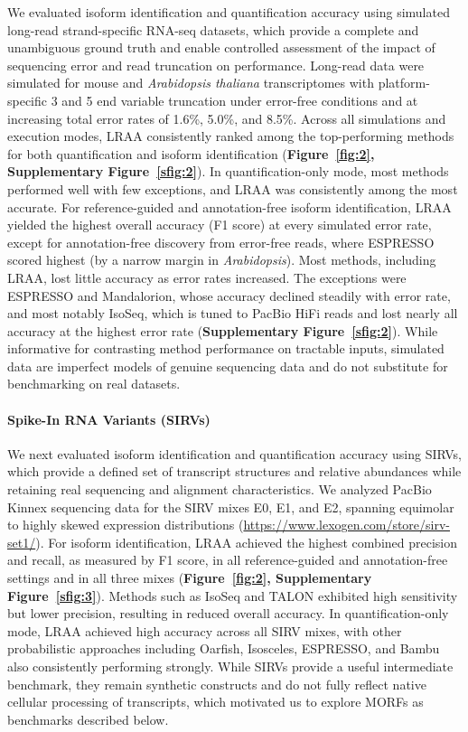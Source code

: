 We evaluated isoform identification and quantification accuracy using simulated long-read strand-specific RNA-seq datasets, which provide a complete and unambiguous ground truth and enable controlled assessment of the impact of sequencing error and read truncation on performance. Long-read data were simulated for mouse and \emph{Arabidopsis thaliana} transcriptomes with platform-specific 3\p{} and 5\p{} end variable truncation under error-free conditions and at increasing total error rates of 1.6\%, 5.0\%, and 8.5\%. Across all simulations and execution modes, LRAA consistently ranked among the top-performing methods for both quantification and isoform identification (\textbf{Figure~\ref{fig:2}, Supplementary Figure~\ref{sfig:2}}). In quantification-only mode, most methods performed well with few exceptions, and LRAA was consistently among the most accurate. For reference-guided and annotation-free isoform identification, LRAA yielded the highest overall accuracy (F1 score) at every simulated error rate, except for annotation-free discovery from error-free reads, where ESPRESSO scored highest (by a narrow margin in \emph{Arabidopsis}). Most methods, including LRAA, lost little accuracy as error rates increased. The exceptions were ESPRESSO and Mandalorion, whose accuracy declined steadily with error rate, and most notably IsoSeq, which is tuned to PacBio HiFi reads and lost nearly all accuracy at the highest error rate (\textbf{Supplementary Figure~\ref{sfig:2}}). While informative for contrasting method performance on tractable inputs, simulated data are imperfect models of genuine sequencing data and do not substitute for benchmarking on real datasets.

\paragraph{Spike-In RNA Variants (SIRVs)}\label{spike-in-rna-variants-sirvs}

We next evaluated isoform identification and quantification accuracy using SIRVs, which provide a defined set of transcript structures and relative abundances while retaining real sequencing and alignment characteristics. We analyzed PacBio Kinnex sequencing data for the SIRV mixes E0, E1, and E2, spanning equimolar to highly skewed expression distributions (\url{https://www.lexogen.com/store/sirv-set1/}). For isoform identification, LRAA achieved the highest combined precision and recall, as measured by F1 score, in all reference-guided and annotation-free settings and in all three mixes (\textbf{Figure~\ref{fig:2}, Supplementary Figure~\ref{sfig:3}}). Methods such as IsoSeq and TALON exhibited high sensitivity but lower precision, resulting in reduced overall accuracy. In quantification-only mode, LRAA achieved high accuracy across all SIRV mixes, with other probabilistic approaches including Oarfish, Isosceles, ESPRESSO, and Bambu also consistently performing strongly. While SIRVs provide a useful intermediate benchmark, they remain synthetic constructs and do not fully reflect native cellular processing of transcripts, which motivated us to explore MORFs as benchmarks described below.

